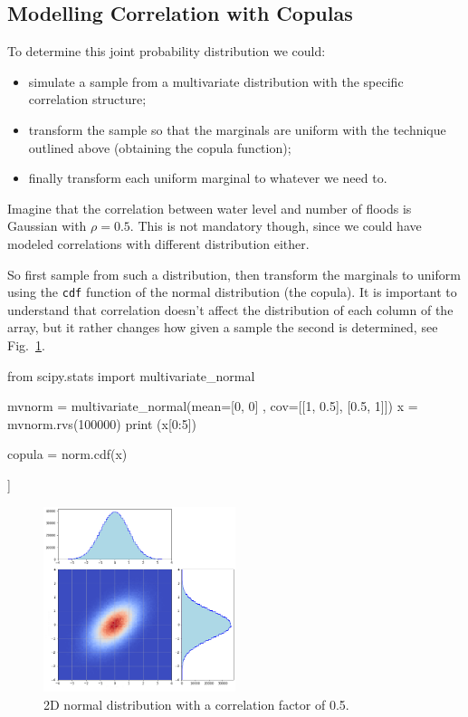 \subsection{Modelling Correlation with Copulas}
\label{adding-correlation-with-gaussian-copulas}

To determine this joint probability distribution we could:
\begin{itemize}
\tightlist
\item simulate a sample from a multivariate distribution with the specific correlation structure;
\item transform the sample so that the marginals are uniform with the technique outlined above (obtaining the copula function);
\item finally transform each uniform marginal to whatever we need to.
\end{itemize}

Imagine that the correlation between water level and number of floods is Gaussian with $\rho=0.5$. This is not mandatory though, since we could have modeled correlations with different distribution either.

So first sample from such a distribution, then transform the marginals to uniform using the \texttt{cdf} function of the normal distribution (the copula).
It is important to understand that correlation doesn't affect the distribution of each column of the array, but it rather changes how given a sample the second is determined, see Fig.~\ref{fig:multivariate_with_correlation}.

\begin{ipython}
from scipy.stats import multivariate_normal

mvnorm = multivariate_normal(mean=[0, 0] , cov=[[1, 0.5],
                                                [0.5, 1]])
x = mvnorm.rvs(100000)
print (x[0:5])

copula = norm.cdf(x)
\end{ipython}
\begin{ioutput}
[[-0.03120891 -0.24918657]
 [-0.17677523 -1.01992715]
 [-0.60572525  0.95517049]
 [-0.79814057  0.69339518]
 [ 0.11990304  0.0947739 ]]
\end{ioutput}

\begin{figure}[htbp]
\centering
\includegraphics[width=0.5\textwidth]{figures/multivariate_2d}
\caption{2D normal distribution with a correlation factor of 0.5.}
\label{fig:multivariate_with_correlation}
\end{figure}
    
